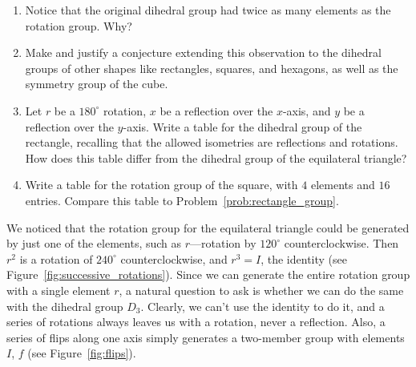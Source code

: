 \documentclass[../gatm.tex]{subfiles}
\begin{document}
\begin{enumerate}
\item Notice that the original dihedral group had twice as many elements as the rotation group. Why?
\item Make and justify a conjecture extending this observation to the dihedral groups of other shapes like rectangles, squares, and hexagons, as well as the symmetry group of the cube.
\item Let $r$ be a $180^{\circ}$ rotation, $x$ be a reflection over the $x$-axis, and $y$ be a reflection over the $y$-axis. Write a table for the dihedral group of the rectangle, recalling that the allowed isometries are reflections and rotations. How does this table differ from the dihedral group of the equilateral triangle? \label{prob:rectangle_group}
\item Write a table for the rotation group of the square, with $4$ elements and $16$ entries. Compare this table to Problem~\ref{prob:rectangle_group}.
\setcounter{rrg_problem_i}{\value{enumi}}
\end{enumerate}

\noindent We noticed that the rotation group for the equilateral triangle could be generated by just one of the elements, such as $r$---rotation by $120^{\circ}$ counterclockwise. Then $r^2$ is a rotation of $240^{\circ}$ counterclockwise, and $r^3=I$, the identity (see Figure~\ref{fig:successive_rotations}). Since we can generate the entire rotation group with a single element $r$, a natural question to ask is whether we can do the same with the dihedral group $D_3$. Clearly, we can't use the identity to do it, and a series of rotations always leaves us with a rotation, never a reflection. Also, a series of flips along one axis simply generates a two-member group with elements $I$, $f$ (see Figure~\ref{fig:flips}).
\end{document}
